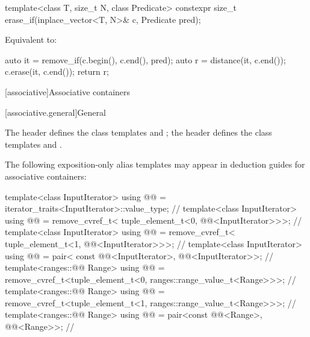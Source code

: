 %
\begin{itemdecl}
template<class T, size_t N, class Predicate>
  constexpr size_t erase_if(inplace_vector<T, N>& c, Predicate pred);
\end{itemdecl}

\begin{itemdescr}
\pnum
\effects
Equivalent to:
\begin{codeblock}
auto it = remove_if(c.begin(), c.end(), pred);
auto r = distance(it, c.end());
c.erase(it, c.end());
return r;
\end{codeblock}
\end{itemdescr}

[associative]{Associative containers}

[associative.general]{General}

\pnum
The header  defines the class templates
 and ;
the header  defines the class templates
 and .

\pnum
The following exposition-only alias templates may appear in deduction guides for associative containers:
\begin{codeblock}
template<class InputIterator>
  using @@ = iterator_traits<InputIterator>::value_type;   // \expos
template<class InputIterator>
  using @@ = remove_cvref_t<
    tuple_element_t<0, @@<InputIterator>>>;                // \expos
template<class InputIterator>
  using @@ = remove_cvref_t<
    tuple_element_t<1, @@<InputIterator>>>;                // \expos
template<class InputIterator>
  using @@ = pair<
    const @@<InputIterator>,
    @@<InputIterator>>;                                   // \expos
template<ranges::@@ Range>
  using @@ =
    remove_cvref_t<tuple_element_t<0, ranges::range_value_t<Range>>>;   // \expos
template<ranges::@@ Range>
  using @@ =
    remove_cvref_t<tuple_element_t<1, ranges::range_value_t<Range>>>;   // \expos
template<ranges::@@ Range>
  using @@ =
    pair<const @@<Range>,
         @@<Range>>;                                     // \expos
\end{codeblock}

